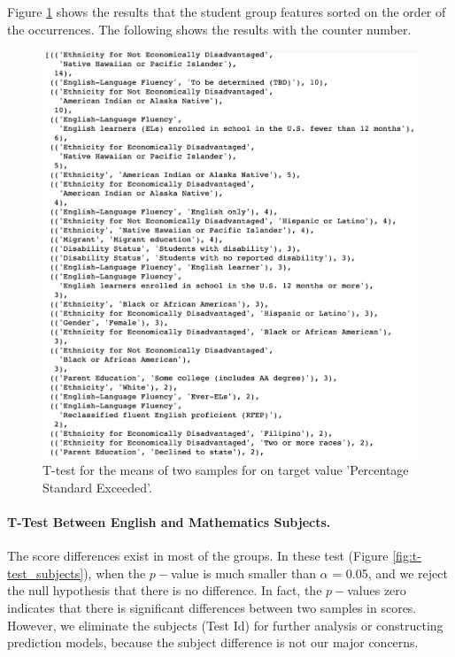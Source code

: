 \documentclass[11pt]{article}
\begin{document}
Figure \ref{fig:t-test_all} shows the results that
the student group features sorted on the order of the occurrences. The following shows the results with the counter number. 
\begin{figure}[h!]
\centering 
\includegraphics[width=\textwidth]{t-test_all.png}
\caption{T-test for the means of two samples for on target value 'Percentage Standard Exceeded'.}
  \label{fig:t-test_all}
\end{figure}

\paragraph*{T-Test Between English and Mathematics Subjects.}

The score differences exist in most of the groups. 
%
In these test (Figure \ref{fig:t-test_subjects}), when the  $p-$value is much smaller than $\alpha$  = 0.05, and we reject the null hypothesis that there is no difference. In fact, the $p-$values zero indicates that there is significant differences between two samples in scores. 
%
However, we eliminate the subjects (Test Id) for further analysis or constructing prediction models, because the subject difference is not our major concerns.
\end{document}
